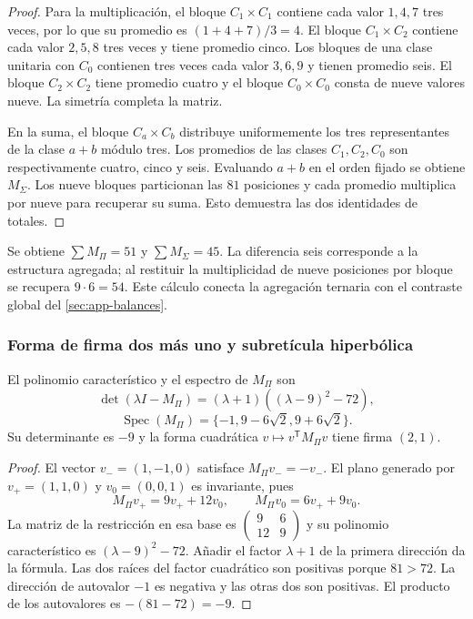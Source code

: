 \begin{proof}
Para la multiplicación, el bloque $C_1\times C_1$ contiene cada valor $1,4,7$ tres veces, por lo que su promedio es $(1+4+7)/3=4$. El bloque $C_1\times C_2$ contiene cada valor $2,5,8$ tres veces y tiene promedio cinco. Los bloques de una clase unitaria con $C_0$ contienen tres veces cada valor $3,6,9$ y tienen promedio seis. El bloque $C_2\times C_2$ tiene promedio cuatro y el bloque $C_0\times C_0$ consta de nueve valores nueve. La simetría completa la matriz.

En la suma, el bloque $C_a\times C_b$ distribuye uniformemente los tres representantes de la clase $a+b$ módulo tres. Los promedios de las clases $C_1,C_2,C_0$ son respectivamente cuatro, cinco y seis. Evaluando $a+b$ en el orden fijado se obtiene $M_\Sigma$. Los nueve bloques particionan las $81$ posiciones y cada promedio multiplica por nueve para recuperar su suma. Esto demuestra las dos identidades de totales.
\end{proof}

Se obtiene $\sum M_\Pi=51$ y $\sum M_\Sigma=45$. La diferencia seis corresponde a la estructura agregada; al restituir la multiplicidad de nueve posiciones por bloque se recupera $9\cdot6=54$. Este cálculo conecta la agregación ternaria con el contraste global del \cref{sec:app-balances}.

\subsubsection{Forma de firma dos más uno y subretícula hiperbólica}

\begin{teorema}
\label{geo:thm-espectro-agregado}
El polinomio característico y el espectro de $M_\Pi$ son
\[
 \det(\lambda I-M_\Pi)
 = (\lambda+1)((\lambda-9)^2-72),
\]
\[
 \operatorname{Spec}(M_\Pi)
 =\{-1,9-6\sqrt2,9+6\sqrt2\}.
\]
Su determinante es $-9$ y la forma cuadrática $v\mapsto v^{\mathsf T}M_\Pi v$ tiene firma $(2,1)$.
\end{teorema}

\begin{proof}
El vector $v_-=(1,-1,0)$ satisface $M_\Pi v_-=-v_-$. El plano generado por $v_+=(1,1,0)$ y $v_0=(0,0,1)$ es invariante, pues
\[
 M_\Pi v_+=9v_++12v_0,\qquad
 M_\Pi v_0=6v_++9v_0.
\]
La matriz de la restricción en esa base es $\left(\begin{smallmatrix}9&6\\12&9\end{smallmatrix}\right)$ y su polinomio característico es $(\lambda-9)^2-72$. Añadir el factor $\lambda+1$ de la primera dirección da la fórmula. Las dos raíces del factor cuadrático son positivas porque $81>72$. La dirección de autovalor $-1$ es negativa y las otras dos son positivas. El producto de los autovalores es $-(81-72)=-9$.
\end{proof}

